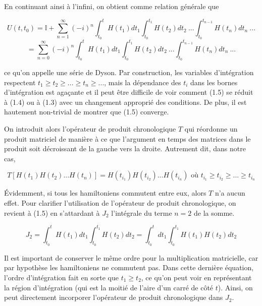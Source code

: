 En continuant ainsi à l'infini, on obtient comme relation générale que

\begin{equation*}
    U(t,t_0) = \mathbb{I} + \sum_{n=1}^{\infty}(-i)^n \int_{t_0}^{t}H(t_1)dt_1\int_{t_0}^{t_1}H(t_2)dt_2 \ ... \int_{t_0}^{t_{n-1}}H(t_n)dt_n \ ...
\end{equation*}
\begin{equation}
    = \sum_{n=0}^{\infty}(-i)^n \int_{t_0}^{t}H(t_1)dt_1\int_{t_0}^{t_1}H(t_2)dt_2 \ ... \int_{t_0}^{t_{n-1}}H(t_n)dt_n \ ...
\end{equation}

ce qu'on appelle une série de Dyson. Par construction, les variables d'intégration respectent $t_1 \geq t_2 \geq ... \geq t_n \geq ...$, mais la dépendance des $t_i$ dans les bornes d'intégration est agaçante et il peut être difficile de voir comment (1.5) se réduit à (1.4) ou à (1.3) avec un changement approprié des conditions. De plus, il est hautement non-trivial de montrer que (1.5) converge. 

On introduit alors l'opérateur de produit chronologique $T$ qui réordonne un produit matriciel de manière à ce que l'argument en temps des matrices dans le produit soit décroissant de la gauche vers la droite. Autrement dit, dans notre cas,

\begin{equation}
    T[H(t_1)H(t_2)...H(t_n)] = H(t_{i_1})H(t_{i_2})...H(t_{i_n}) \text{ où } t_{i_1} \geq t_{i_2} \geq ... \geq t_{i_n}
\end{equation}

Évidemment, si tous les hamiltoniens commutent entre eux, alors $T$ n'a aucun effet. Pour clarifier l'utilisation de l'opérateur de produit chronologique, on revient à (1.5) en s'attardant à $J_2$ l'intégrale du terme $n=2$ de la somme.

\begin{equation*}
    J_2 = \int_{t_0}^{t}H(t_1)dt_1\int_{t_0}^{t_1}H(t_2)dt_2 = \int_{t_0}^{t}dt_1\int_{t_0}^{t_1}H(t_1)H(t_2)dt_2
\end{equation*}

Il est important de conserver le même ordre pour la multiplication matricielle, car par hypothèse les hamiltoniens ne commutent pas. Dans cette dernière équation, l'ordre d'intégration fait en sorte que $t_1 \geq t_2$, ce qu'on peut voir en représentant la région d'intégration (qui est la moitié de l'aire d'un carré de côté $t$). Ainsi, on peut directement incorporer l'opérateur de produit chronologique dans $J_2$.


